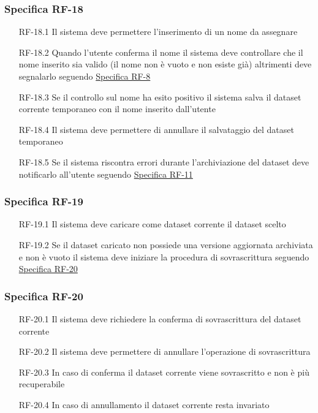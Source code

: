 \subsubsection{Specifica RF-18}
\label{subsubsec:RF-18}
\begin{enumerate}
    \item[RF-18.1] Il sistema deve permettere l'inserimento di un nome da assegnare
    \item[RF-18.2] Quando l'utente conferma il nome il sistema deve controllare che il nome inserito sia valido (il nome non è vuoto e non esiste già) altrimenti deve segnalarlo seguendo \hyperref[subsubsec:RF-8]{Specifica RF-8}
    \item[RF-18.3] Se il controllo sul nome ha esito positivo il sistema salva il dataset corrente temporaneo con il nome inserito dall'utente
    \item[RF-18.4] Il sistema deve permettere di annullare il salvataggio del dataset temporaneo
    \item[RF-18.5] Se il sistema riscontra errori durante l'archiviazione del dataset deve notificarlo all'utente seguendo \hyperref[subsubsec:RF-11]{Specifica RF-11}
\end{enumerate}

\subsubsection{Specifica RF-19}
\label{subsubsec:RF-19}
\begin{enumerate}
    \item[RF-19.1] Il sistema deve caricare come dataset corrente il dataset scelto
    \item[RF-19.2] Se il dataset caricato non possiede una versione aggiornata archiviata e non è vuoto il sistema deve iniziare la procedura di sovrascrittura seguendo \hyperref[subsubsec:RF-20]{Specifica RF-20}
\end{enumerate}

\subsubsection{Specifica RF-20}
\label{subsubsec:RF-20}
\begin{enumerate}
    \item[RF-20.1] Il sistema deve richiedere la conferma di sovrascrittura del dataset corrente
    \item[RF-20.2] Il sistema deve permettere di annullare l'operazione di sovrascrittura
    \item[RF-20.3] In caso di conferma il dataset corrente viene sovrascritto e non è più recuperabile
    \item[RF-20.4] In caso di annullamento il dataset corrente resta invariato 
\end{enumerate}

